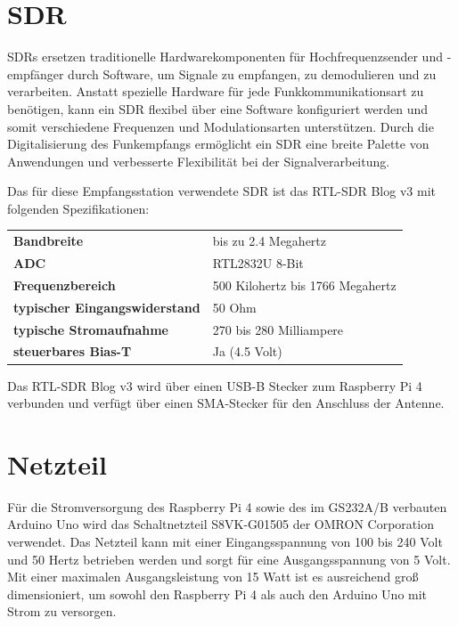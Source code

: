 \section{SDR}
\label{sec:sdr}
SDRs ersetzen traditionelle Hardwarekomponenten für Hochfrequenzsender und -empfänger durch Software, um Signale zu empfangen, zu demodulieren und zu verarbeiten. Anstatt spezielle Hardware für jede Funkkommunikationsart zu benötigen, kann ein SDR flexibel über eine Software konfiguriert werden und somit verschiedene Frequenzen und Modulationsarten unterstützen. Durch die Digitalisierung des Funkempfangs ermöglicht ein SDR eine breite Palette von Anwendungen und verbesserte Flexibilität bei der Signalverarbeitung. \cite{noauthor_sdr_nodate}

Das für diese Empfangsstation verwendete SDR ist das RTL-SDR Blog v3 mit folgenden Spezifikationen:
\begin{table}
	\centering
	\begin{tabular}{ll}
		\textbf{Bandbreite} & bis zu 2.4 Megahertz \\
		\textbf{ADC} & RTL2832U 8-Bit \\
		\textbf{Frequenzbereich} & 500 Kilohertz bis 1766 Megahertz \\
		\textbf{typischer Eingangswiderstand} & 50 Ohm \\
		\textbf{typische Stromaufnahme} & 270 bis 280 Milliampere \\
		\textbf{steuerbares Bias-T} & Ja (4.5 Volt) \\
	\end{tabular}
\end{table}

Das RTL-SDR Blog v3 wird über einen USB-B Stecker zum Raspberry Pi 4 verbunden und verfügt über einen SMA-Stecker für den Anschluss der Antenne.\cite{noauthor_rtl-sdr_nodate}

\section{Netzteil}
\label{sec:Netzteil}
Für die Stromversorgung des Raspberry Pi 4 sowie des im GS232A/B verbauten Arduino Uno wird das Schaltnetzteil S8VK-G01505 der OMRON Corporation verwendet. Das Netzteil kann mit einer Eingangsspannung von 100 bis 240 Volt und 50 Hertz betrieben werden und sorgt für eine Ausgangsspannung von 5 Volt. Mit einer maximalen Ausgangsleistung von 15 Watt ist es ausreichend groß dimensioniert, um sowohl den Raspberry Pi 4 \cite{noauthor_power_nodate} als auch den Arduino Uno \cite{noauthor_r3_nodate} mit Strom zu versorgen. \cite{noauthor_s8vk-g01505_nodate}

